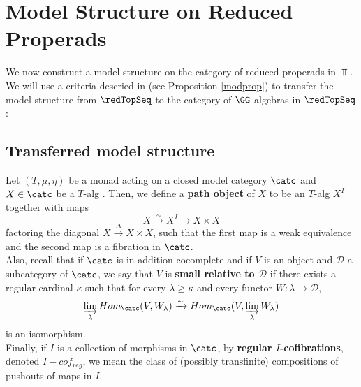 \documentclass[a4paper,10pt]{amsart}
\begin{document}
\section{Model Structure on Reduced Properads}
We now construct a model structure on the category of reduced properads in $\Top$. We will use a criteria descried in \cite{schwede2000algebras} (see Proposition \ref{modprop}) to transfer the model structure from $\redTopSeq$ to the category of $\GG$-algebras in $\redTopSeq$:

\subsection{Transferred model structure}%
Let $(T,\mu,\eta)$ be a monad	 acting on a closed model category $\catc$ and $X \in \catc$ be a $T$-alg . Then, we define a \textbf{path object} of $X$ to be an $T$-alg $X^{I}$ together with maps 
\[ X \xrightarrow{\sim} X^I \xrightarrow{} X \times X\]
factoring the diagonal $X \xrightarrow{\Delta} X \times X$, such that the first map is a weak equivalence and the second map is a fibration in $\catc$.\\
Also, recall that if $\catc$ is in addition cocomplete and if $V$ is an object and $\mathcal{D}$ a subcategory of $\catc$, we say that $V$ is \textbf{small relative to $\mathcal{D}$} if there exists a regular cardinal $\kappa$ such that for every $\lambda \geq \kappa$ and every functor $W \colon \lambda \to \mathcal{D}$, 
\[ \varinjlim_{\lambda} Hom_{\catc}(V,W_{\lambda}) \xrightarrow{\sim} Hom_{\catc}(V,\varinjlim_{\lambda}W_{\lambda}) \]
is an isomorphism.\\ %
Finally, if $I$ is a collection of morphisms in $\catc$, by \textbf{regular $I$-cofibrations}, denoted $I-cof_{reg}$, we mean the class of (possibly transfinite) compositions of pushouts of maps in $I$.
\end{document}
